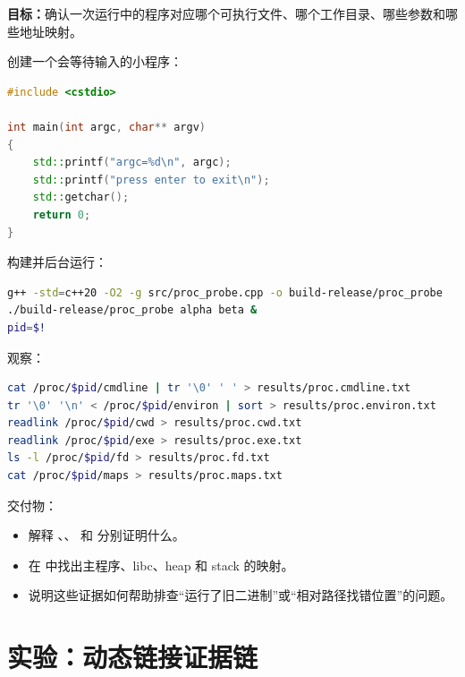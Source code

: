 \begin{labbox}
\textbf{目标：}确认一次运行中的程序对应哪个可执行文件、哪个工作目录、哪些参数和哪些地址映射。

创建一个会等待输入的小程序：

\begin{lstlisting}[language=C++]
#include <cstdio>

int main(int argc, char** argv)
{
    std::printf("argc=%d\n", argc);
    std::printf("press enter to exit\n");
    std::getchar();
    return 0;
}
\end{lstlisting}

构建并后台运行：

\begin{lstlisting}[language=bash]
g++ -std=c++20 -O2 -g src/proc_probe.cpp -o build-release/proc_probe
./build-release/proc_probe alpha beta &
pid=$!
\end{lstlisting}

观察：

\begin{lstlisting}[language=bash]
cat /proc/$pid/cmdline | tr '\0' ' ' > results/proc.cmdline.txt
tr '\0' '\n' < /proc/$pid/environ | sort > results/proc.environ.txt
readlink /proc/$pid/cwd > results/proc.cwd.txt
readlink /proc/$pid/exe > results/proc.exe.txt
ls -l /proc/$pid/fd > results/proc.fd.txt
cat /proc/$pid/maps > results/proc.maps.txt
\end{lstlisting}

交付物：

\begin{itemize}
  \item 解释 、、 和  分别证明什么。
  \item 在  中找出主程序、libc、heap 和 stack 的映射。
  \item 说明这些证据如何帮助排查“运行了旧二进制”或“相对路径找错位置”的问题。
\end{itemize}
\end{labbox}

\section{实验：动态链接证据链}

